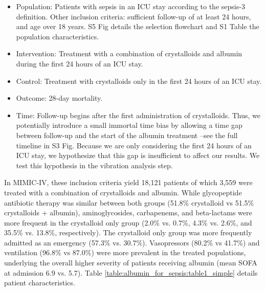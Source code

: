 \documentclass[10pt,letterpaper]{article}
\begin{document}
\begin{itemize}[leftmargin=2ex]
  \item \textcolor{P}{Population}: Patients with sepsis in an ICU stay according
        to the sepsis-3 definition. Other inclusion criteria: sufficient
        follow-up of at least 24 hours, and age over 18 years.
        S5 Fig details the selection flowchart and
        S1 Table the population
        characteristics.

  \item \textcolor{I}{Intervention}: Treatment with a combination of
        crystalloids and albumin during the first 24 hours of an ICU stay.

  \item \textcolor{C}{Control}: Treatment with crystalloids only in the first 24
        hours of an ICU stay.

  \item \textcolor{O}{Outcome}: 28-day mortality.

  \item \textcolor{T}{Time}: Follow-up begins after the first administration of
        crystalloids. Thus, we potentially introduce a small immortal time bias
        by allowing a time gap between follow-up and the start of the albumin
        treatment --see the full timeline in S3 Fig. Because
        we are only considering the first 24 hours of an ICU stay, we
        hypothesize that this gap is insufficient to affect our results. We test
        this hypothesis in the vibration analysis step.
\end{itemize}

In MIMIC-IV, these inclusion criteria yield 18,121 patients of which 3,559 were treated with a combination of crystalloids and albumin. While glycopeptide antibiotic therapy   was similar between both groups (51.8\% crystalloid vs 51.5\% crystalloids + albumin), aminoglycosides, carbapenems, and beta-lactams were more frequent in the crystalloid only group (2.0\% vs. 0.7\%, 4.3\% vs. 2.6\%, and 35.5\% vs. 13.8\%, respectively). The crystalloid only group was more frequently admitted as an emergency (57.3\% vs. 30.7\%). Vasopressors (80.2\% vs 41.7\%) and ventilation (96.8\% vs 87.0\%) were more prevalent in the treated populations, underlying the overall higher severity of patients receiving albumin (mean SOFA at admission 6.9 vs. 5.7).
Table \ref{table:albumin_for_sepsis:table1_simple} details
patient characteristics.
\end{document}
